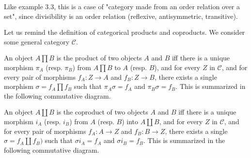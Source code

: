 Like example 3.3, this is a case of "category made from an order relation over a set", since divisibility is an order relation (reflexive, antisymmetric, transitive).

Let us remind the definition of categorical products and coproducts. We consider some general category $\mathcal{C}$.

An object $A \prod B$ is the product of two objects $A$ and $B$ iff there is a unique morphism $\pi_A$ (resp. $\pi_B$) from $A \prod B$ to $A$ (resp. $B$), and for every $Z$ in $\mathcal{C}$, and for every pair of morphisms $f_A : Z \to A$ and $f_B : Z \to B$, there exists a single morphism $\sigma = f_A \prod f_B$ such that $\pi_A \sigma = f_A$ and $\pi_B \sigma = f_B$. This is summarized in the following commutative diagram.


An object $A \coprod B$ is the coproduct of two objects $A$ and $B$ iff there is a unique morphism $i_A$ (resp. $i_B$) from $A$ (resp. $B$) into $A \coprod B$, and for every $Z$ in $\mathcal{C}$, and for every pair of morphisms $f_A : A \to Z$ and $f_B : B \to Z$, there exists a single $\sigma = f_A \coprod f_B)$ such that $\sigma i_A = f_A$ and $\sigma i_B = f_B$. This is summarized in the following commutative diagram.


